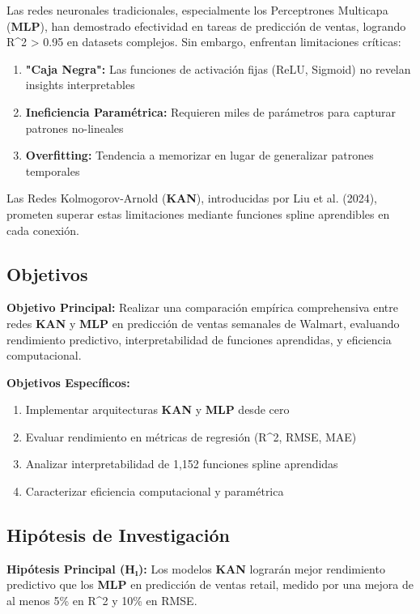 \documentclass[10pt,twocolumn]{article}
\newcommand{\kan}{\textbf{KAN}}
\newcommand{\mlp}{\textbf{MLP}}
\newcommand{\rsquared}{R^2}
\begin{document}
Las redes neuronales tradicionales, especialmente los Perceptrones Multicapa (\mlp), han demostrado efectividad en tareas de predicción de ventas, logrando \rsquared{} > 0.95 en datasets complejos. Sin embargo, enfrentan limitaciones críticas:

\begin{enumerate}
    \item \textbf{"Caja Negra":} Las funciones de activación fijas (ReLU, Sigmoid) no revelan insights interpretables
    \item \textbf{Ineficiencia Paramétrica:} Requieren miles de parámetros para capturar patrones no-lineales
    \item \textbf{Overfitting:} Tendencia a memorizar en lugar de generalizar patrones temporales
\end{enumerate}

Las Redes Kolmogorov-Arnold (\kan), introducidas por Liu et al. (2024), prometen superar estas limitaciones mediante funciones spline aprendibles en cada conexión.

\subsection{Objetivos}

\textbf{Objetivo Principal:}
Realizar una comparación empírica comprehensiva entre redes \kan{} y \mlp{} en predicción de ventas semanales de Walmart, evaluando rendimiento predictivo, interpretabilidad de funciones aprendidas, y eficiencia computacional.

\textbf{Objetivos Específicos:}
\begin{enumerate}
    \item Implementar arquitecturas \kan{} y \mlp{} desde cero
    \item Evaluar rendimiento en métricas de regresión (\rsquared, RMSE, MAE)
    \item Analizar interpretabilidad de 1,152 funciones spline aprendidas
    \item Caracterizar eficiencia computacional y paramétrica
\end{enumerate}

\subsection{Hipótesis de Investigación}

\textbf{Hipótesis Principal (H₁):} Los modelos \kan{} lograrán mejor rendimiento predictivo que los \mlp{} en predicción de ventas retail, medido por una mejora de al menos 5\% en \rsquared{} y 10\% en RMSE.
\end{document}
